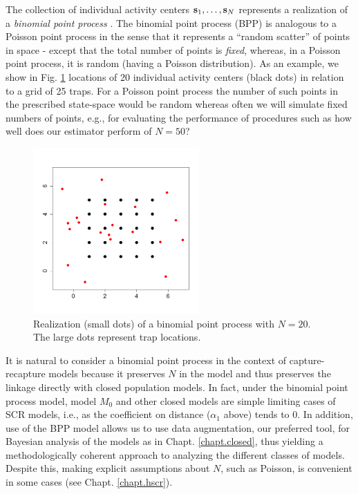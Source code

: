 The collection of individual activity centers ${\bf s}_{1},\ldots,
{\bf s}_{N}$ represents a realization of a {\it binomial point process}
\citep[][p. 61]{illian_etal:2008}.  The binomial point process (BPP)
is analogous to a Poisson point process in the sense that it
represents a ``random scatter'' of points in space - except that the
total number of points is {\it fixed}, whereas, in a Poisson point
process, it is random (having a Poisson distribution).  As an example,
we show in Fig. \ref{scr0.fig.bpp} locations of 20 individual activity
centers (black dots) in relation to a grid of 25 traps. For a Poisson
point process the number of such points in the prescribed state-space
would be random whereas often we will simulate fixed numbers of
points, e.g., for evaluating the performance of procedures such as how
well does our estimator perform of $N=50$?
\begin{figure}[ht]
\begin{center}
\includegraphics[height=2.5in]{Ch4-SCR0/figs/binomialpoint}
\end{center}
\caption{Realization (small dots) of a binomial point process with $N=20$. The
  large dots represent trap locations.
}
\label{scr0.fig.bpp}
\end{figure}

It is natural to consider a binomial point process in the context of
capture-recapture models because it preserves $N$ in the model and thus
preserves the linkage directly with closed population models. In fact,
under the binomial point process model, model $M_0$ and other closed
models are simple limiting cases of SCR models, i.e., as the
coefficient on distance ($\alpha_1$ above) tends to 0.
In addition, use of
the BPP model allows us to use data augmentation, our preferred tool,  for Bayesian analysis
of the models as in Chapt. \ref{chapt.closed}, thus yielding a methodologically
coherent approach to analyzing the different classes of
models. Despite this, making explicit assumptions about $N$, such as
Poisson, is convenient in some cases (see Chapt. \ref{chapt.hscr}).

